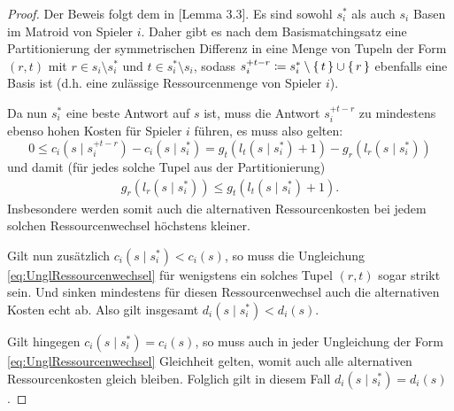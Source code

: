 \begin{proof}
	Der Beweis folgt dem in \cite{OptiIVSkript}[Lemma 3.3].	Es sind sowohl $s^\ast_i$ als auch $s_i$ Basen im Matroid von Spieler $i$. Daher gibt es nach dem Basismatchingsatz eine Partitionierung der symmetrischen Differenz in eine Menge von Tupeln der Form $(r,t)$ mit $r \in s_i\setminus s^\ast_i$ und $t \in s^\ast_i \setminus s_i$, sodass $s_i^{+t-r} \coloneqq s^\ast_i\setminus\set{t}\cup\set{r}$ ebenfalls eine Basis ist (d.h. eine zulässige Ressourcenmenge von Spieler $i$).
	
	Da nun $s^\ast_i$ eine beste Antwort auf $s$ ist, muss die Antwort $s_i^{+t-r}$ zu mindestens ebenso hohen Kosten für Spieler $i$ führen, es muss also gelten:
		\[0 \leq c_i(s \mid s_i^{+t-r}) - c_i(s \mid s^\ast_i) = g_t(l_t(s \mid s^\ast_i)+1) - g_r(l_r(s \mid s^\ast_i))\]
	und damit (für jedes solche Tupel aus der Partitionierung)
	\begin{align}\label{eq:UnglRessourcenwechsel}
		g_r(l_r(s \mid s^\ast_i)) \leq g_t(l_t(s \mid s^\ast_i)+1).
	\end{align}
	Insbesondere werden somit auch die alternativen Ressourcenkosten bei jedem solchen Ressourcenwechsel höchstens kleiner.
	
	Gilt nun zusätzlich $c_i(s \mid s^\ast_i) < c_i(s)$, so muss die Ungleichung \eqref{eq:UnglRessourcenwechsel} für wenigstens ein solches Tupel $(r,t)$ sogar strikt sein. Und sinken mindestens für diesen Ressourcenwechsel auch die alternativen Kosten echt ab. Also gilt insgesamt $d_i(s \mid s^\ast_i) < d_i(s)$.
	
	Gilt hingegen $c_i(s \mid s^\ast_i) = c_i(s)$, so muss auch in jeder Ungleichung der Form \eqref{eq:UnglRessourcenwechsel} Gleichheit gelten, womit auch alle alternativen Ressourcenkosten gleich bleiben. Folglich gilt in diesem Fall $d_i(s \mid s^\ast_i) = d_i(s)$.
\end{proof}

